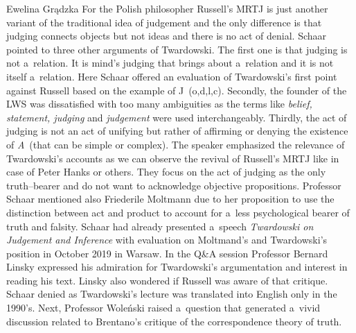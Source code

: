 \begin{editorialeng}{Ewelina Grądzka}
 For the Polish philosopher Russell’s MRTJ is just another variant of the traditional idea of judgement and the only difference is that judging connects objects but not ideas and there is no act of denial. Schaar pointed to three other arguments of Twardowski. The first one is that judging is not a~relation. It is mind’s judging that brings about a~relation and it is not itself a~relation. Here Schaar offered an evaluation of Twardowski’s first point against Russell based on the example of J~(o,d,l,c). Secondly, the founder of the LWS was dissatisfied with too many ambiguities as the terms like \textit{belief, statement, judging} and \textit{judgement} were used interchangeably. Thirdly, the act of judging is not an act of unifying but rather of affirming or denying the existence of \textit{A}~(that can be simple or complex). The speaker emphasized the relevance of Twardowski’s accounts as we can observe the revival of Russell’s MRTJ like in case of Peter Hanks or others. They focus on the act of judging as the only truth--bearer and do not want to acknowledge objective propositions. Professor Schaar mentioned also Friederile Moltmann due to her proposition to use the distinction between act and product to account for a~less psychological bearer of truth and falsity. Schaar had already presented a~speech \textit{Twardowski on Judgement and Inference} with evaluation on Moltmand’s and Twardowski’s position in October 2019 in Warsaw. In the Q\&A session Professor Bernard Linsky expressed his admiration for Twardowski’s argumentation and interest in reading his text. Linsky also wondered if Russell was aware of that critique. Schaar denied as Twardowski’s lecture was translated into English only in the 1990’s. Next, Professor Woleński raised a~question that generated a~vivid discussion related to Brentano’s critique of the correspondence theory of truth.


\end{editorialeng}
